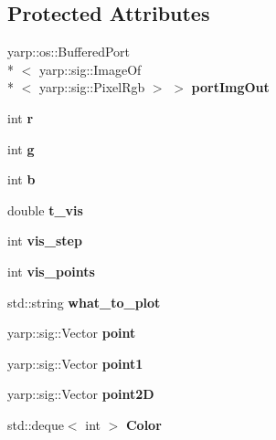 \subsection*{Protected Attributes}
\begin{DoxyCompactItemize}
\item 
yarp\-::os\-::\-Buffered\-Port\\*
$<$ yarp\-::sig\-::\-Image\-Of\\*
$<$ yarp\-::sig\-::\-Pixel\-Rgb $>$ $>$ {\bfseries port\-Img\-Out}\label{classSuperqVisualization_a0ed5bf82e324579e781952b7a540d5c0}

\item 
int {\bfseries r}\label{classSuperqVisualization_aee081a694340a9a8658a960872cb6172}

\item 
int {\bfseries g}\label{classSuperqVisualization_a51cc6e3ac3ee243250a7042f00c813d1}

\item 
int {\bfseries b}\label{classSuperqVisualization_a96c39287f863466bbbc21342dd62b68a}

\item 
double {\bfseries t\-\_\-vis}\label{classSuperqVisualization_af984de33154bf4ebe0abf6f1f5047a1c}

\item 
int {\bfseries vis\-\_\-step}\label{classSuperqVisualization_a43a34e1d587532fbff246941cd28e3b6}

\item 
int {\bfseries vis\-\_\-points}\label{classSuperqVisualization_a97eaa294a7c48033ef5695976556435a}

\item 
std\-::string {\bfseries what\-\_\-to\-\_\-plot}\label{classSuperqVisualization_a60f1dd2489b897777edffc4dfdebe64d}

\item 
yarp\-::sig\-::\-Vector {\bfseries point}\label{classSuperqVisualization_a77fbae5c4996f393cae867d56cf2ee16}

\item 
yarp\-::sig\-::\-Vector {\bfseries point1}\label{classSuperqVisualization_a43a15830ead614d6962ac4777c8fc014}

\item 
yarp\-::sig\-::\-Vector {\bfseries point2\-D}\label{classSuperqVisualization_a186ba8f98b1344934bab2fc2de516375}

\item 
std\-::deque$<$ int $>$ {\bfseries Color}\label{classSuperqVisualization_ae976f619addaebdf724316f25e2c38a8}


\end{DoxyCompactItemize}
